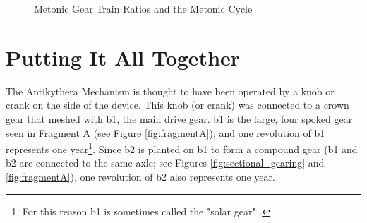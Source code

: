 \documentclass[11pt, oneside]{article}   	%
\theoremstyle{definition}
\begin{document}
\bigskip
\begin{figure}[H]
\caption{Metonic Gear Train Ratios and the Metonic Cycle}
\label{fig:metonic_gear_ratios}
\end{figure}


\bigskip
\section{Putting It All Together}
The Antikythera Mechanism is thought to have been operated by a knob or crank on the side of the device. This knob (or crank) was connected
to a crown gear that meshed with b1, the main drive gear. b1 is the large, four spoked gear seen in Fragment A (see Figure \ref{fig:fragmentA}), 
and one revolution of b1 represents one year\footnote{For this reason b1 is sometimes called the "solar gear" \cite{pin_and_slot_device}.}. Since 
b2 is planted on b1 to form a compound gear (b1 and b2 are connected to the same axle; see Figures  \ref{fig:sectional_gearing} and \ref{fig:fragmentA}), 
one revolution of b2 also represents one year. 
\end{document}
